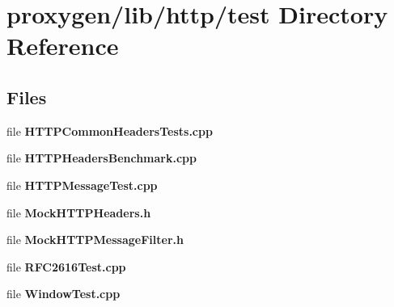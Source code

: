 \section{proxygen/lib/http/test Directory Reference}
\label{dir_e11ec9d2aa26e74ab1bf147bdfb5f2ea}
\subsection*{Files}
\begin{DoxyCompactItemize}
\item 
file {\bf H\+T\+T\+P\+Common\+Headers\+Tests.\+cpp}
\item 
file {\bf H\+T\+T\+P\+Headers\+Benchmark.\+cpp}
\item 
file {\bf H\+T\+T\+P\+Message\+Test.\+cpp}
\item 
file {\bf Mock\+H\+T\+T\+P\+Headers.\+h}
\item 
file {\bf Mock\+H\+T\+T\+P\+Message\+Filter.\+h}
\item 
file {\bf R\+F\+C2616\+Test.\+cpp}
\item 
file {\bf Window\+Test.\+cpp}
\end{DoxyCompactItemize}
